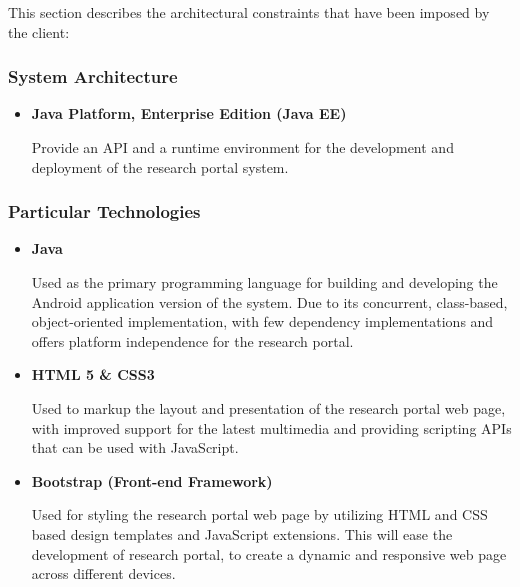 \documentclass[hidelinks,a4paper,12pt]{article}
\begin{document}
\begin{flushleft}
		This section describes the architectural constraints that have been imposed by the client:
	
	\subsubsection{System Architecture}
	
	\begin{itemize}
		\item 	\textbf{Java Platform, Enterprise Edition (Java EE)}
			
		Provide an API and a runtime environment for the development and deployment of the research portal system. 
	\end{itemize}
	
	\subsubsection{Particular Technologies}
	
	\begin{itemize}
		\item \textbf{Java}
		
	Used as the primary programming language for building and developing the Android application version of the system.
	Due to its concurrent, class-based, object-oriented implementation, with few dependency implementations and offers platform independence for the research portal.
	\end{itemize}
		
	\begin{itemize}
		\item \textbf{HTML 5 \& CSS3}
		
	Used to markup the layout and presentation of the research portal web page, with improved support for the latest multimedia and providing scripting APIs that can be used with JavaScript.
	\end{itemize}
		
	\begin{itemize}
		\item 	\textbf{Bootstrap (Front-end Framework)}
			
		Used for styling the research portal web page by utilizing HTML and CSS based design templates and  JavaScript extensions. 
		This will ease the development of research portal, to create a dynamic and responsive web page across different devices.
	\end{itemize}
	

\end{flushleft}
\end{document}
